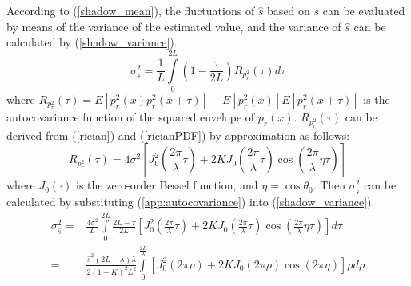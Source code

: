 According to (\ref{shadow_mean}), the fluctuations of $\hat{s}$ based on $s$ can be evaluated by means of the variance of the estimated value, and the variance of $\hat{s}$ can be calculated by (\ref{shadow_variance}).
\begin{equation}
    \sigma_{\hat{s}}^{2}=\frac{1}{L}\int\limits_{0}^{2L}\left(1-\frac{\tau}{2L}\right)R_{p_{r}^2}(\tau)d\tau
\label{shadow_variance}
\end{equation}
where $R_{p_{r}^2}(\tau)=E[p_{r}^{2}(x)p_{r}^{2}(x+\tau)]-E[p_{r}^{2}(x)]E[p_{r}^{2}(x+\tau)]$ is the autocovariance function of the squared envelope of $p_{r}(x)$. $R_{p_{r}^2}(\tau)$ can be derived from (\ref{rician}) and (\ref{ricianPDF}) by approximation\cite{Austin1994} as follows:
\begin{equation}
    R_{p_{r}^2}(\tau)=4\sigma^2\left[J_0^2\left(\frac{2\pi}{\lambda}\tau\right)+2KJ_0\left(\frac{2\pi}{\lambda}\tau\right)\cos\left(\frac{2\pi}{\lambda}\eta\tau\right)\right]
\label{app:autocovariance}
\end{equation}
where $J_0(\cdot)$ is the zero-order Bessel function, and $\eta=\cos\theta_0$. Then $\sigma_{\hat{s}}^2$ can be calculated by substituting (\ref{app:autocovariance}) into (\ref{shadow_variance}).
\begin{equation}
\begin{split}
\sigma_{\hat{s}}^{2}=&\frac{4\sigma^2}{L}\int\limits_{0}^{2L}\frac{2L-\tau}{2L}[J_0^2(\frac{2\pi}{\lambda}\tau)+2KJ_0(\frac{2\pi}{\lambda}\tau)\cos(\frac{2\pi}{\lambda}\eta\tau)]d\tau\\
=&\frac{\hat{s}^2(2L-\lambda)\lambda}{2(1+K)^{2}L^2}\int\limits_0^{\frac{2L}{\lambda}}[J_0^2(2\pi \rho)+2KJ_0(2\pi \rho)\cos(2\pi \eta)]\rho d\rho
\end{split}
\label{app:shadow_sigma}
\end{equation}
